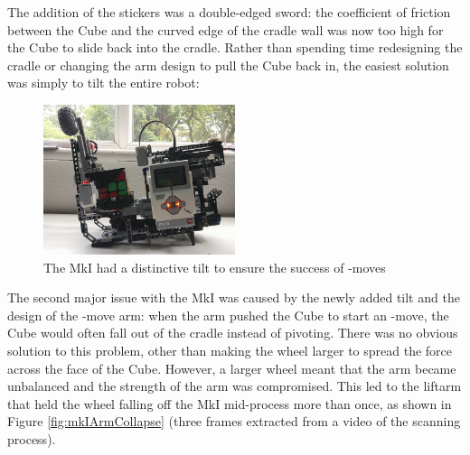 \documentclass{report}
\newcommand{\move}[1]{\uppercase{\texttt{\formatmovesnospace{#1}}}-move}
\begin{document}
	The addition of the stickers was a double-edged sword: the coefficient of friction between the Cube and the curved edge of the cradle wall was now too high for the Cube to slide back into the cradle. Rather than spending time redesigning the cradle or changing the arm design to pull the Cube back in, the easiest solution was simply to tilt the entire robot:
	
	\begin{figure}[H]
		\centering
		\includegraphics[width=0.5\textwidth]{Resources/Images/imgCubeSolverV1.png}
		\caption{The MkI had a distinctive tilt to ensure the success of \move{x}s}
		\label{fig:imgCubeSolverV1}
	\end{figure}

	The second major issue with the MkI was caused by the newly added tilt and the design of the \move{x} arm: when the arm pushed the Cube to start an \move{x}, the Cube would often fall out of the cradle instead of pivoting. There was no obvious solution to this problem, other than making the wheel larger to spread the force across the face of the Cube. However, a larger wheel meant that the arm became unbalanced and the strength of the arm was compromised. This led to the liftarm that held the wheel falling off the MkI mid-process more than once, as shown in Figure \ref{fig:mkIArmCollapse} (three frames extracted from a video of the scanning process).
\end{document}
